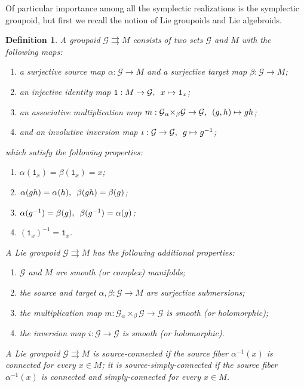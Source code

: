 \documentclass{amsart}
\newtheorem{definition}[theorem]{Definition}
\numberwithin{equation}{section}
\newcommand{\cG}{\mathcal{G}}
\begin{document}
Of particular importance among all the symplectic realizations is the symplectic groupoid, but first we recall the notion of Lie groupoids and Lie algebroids.
\begin{definition} \label{def:groupoid}
  A \emph{groupoid} $\cG\rightrightarrows M$ consists of two sets $\cG$ and $M$ with the following maps:
  \begin{enumerate}
    \item a surjective \emph{source map} $\alpha: \cG \to M$ and a surjective \emph{target map} $\beta: \cG \to M$;
    \item an injective identity map $\mathtt{1}: M \to \cG, \enskip x \mapsto \mathtt{1}_x$;
    \item an associative multiplication map $m: \cG {_\alpha \times_\beta} \cG \to \cG, \enskip (g, h) \mapsto gh$;
    \item and an involutive inversion map $\iota: \cG \to \cG, \enskip g \mapsto g^{-1}$;
  \end{enumerate}
  which satisfy the following properties:
  \begin{enumerate}
    \item $\alpha(\mathtt{1}_x) = \beta(\mathtt{1}_x) = x$;
    \item $\alpha(gh) = \alpha(h), \enskip \beta(gh) = \beta(g)$;
    \item $\alpha(g^{-1}) = \beta(g), \enskip \beta(g^{-1}) = \alpha(g)$;
    \item $(\mathtt{1}_x)^{-1} = \mathtt{1}_x$.
  \end{enumerate}
  A \emph{Lie groupoid} $\cG \rightrightarrows M$ has the following additional properties:
  \begin{enumerate}
    \item $\cG$ and $M$ are smooth (or complex) manifolds;
    \item the source and target $\alpha,\beta: \cG \to M$ are surjective submersions;
    \item the multiplication map $m: \cG {_\alpha \times_\beta} \cG \to \cG$ is smooth (or holomorphic);
    \item the inversion map $i: \cG \to \cG$ is smooth (or holomorphic).
  \end{enumerate}
  A Lie groupoid $\cG \rightrightarrows M$ is \emph{source-connected} if the source fiber $\alpha^{-1}(x)$ is connected for every $x \in M$; it is \emph{source-simply-connected} if the source fiber $\alpha^{-1}(x)$ is connected and simply-connected for every $x \in M$.
\end{definition}
\end{document}
